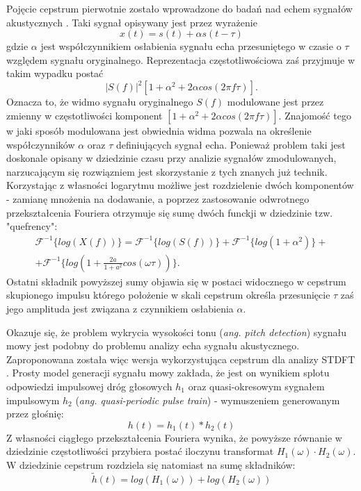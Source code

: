 Pojęcie cepstrum pierwotnie zostało wprowadzone do badań nad echem sygnałów akustycznych \cite{hdsp}. Taki sygnał opisywany jest przez wyrażenie 
\begin{equation}
     x(t) = s(t) + \alpha s(t - \tau) 
\end{equation} 
gdzie $ \alpha $ jest współczynnikiem osłabienia sygnału echa przesuniętego w czasie o $ \tau $ względem sygnału oryginalnego. Reprezentacja częstotliwościowa zaś przyjmuje w takim wypadku postać 
\begin{equation}
    |S(f)|^2\left[ 1+ \alpha^2+2\alpha cos(2\pi f\tau)\right].
\end{equation}
Oznacza to, że widmo sygnału oryginalnego $S(f)$ modulowane jest przez zmienny w częstotliwości komponent $[1 + \alpha^2 + 2\alpha cos(2\pi f \tau)]$. Znajomość tego w jaki sposób modulowana jest obwiednia widma pozwala na określenie współczynników $\alpha$  oraz $\tau$ definiujących sygnał echa. Ponieważ problem taki jest doskonale opisany w dziedzinie czasu przy analizie sygnałów zmodulowanych, narzucającym się rozwiązniem jest skorzystanie z tych znanych już technik. Korzystając z własności logarytmu możliwe jest rozdzielenie dwóch komponentów - zamianę mnożenia na dodawanie, a poprzez zastosowanie odwrotnego przekształcenia Fouriera otrzymuje się sumę dwóch funckji w dziedzinie tzw. "quefrency": 
\begin{equation}
    \begin{split}
    \mathcal{F}^{-1}\{log(X(f))\} =   \mathcal{F}^{-1}\{log(S(f))\} + \mathcal{F}^{-1}\{log(1+\alpha^2)\} + \\ + \mathcal{F}^{-1}\{log(1+\frac{2a}{1+a^2} cos(\omega \tau))\}.
    \end{split}
\end{equation}
Ostatni składnik powyższej sumy objawia się w postaci widocznego w cepstrum skupionego impulsu którego położenie w skali cepstrum określa przesunięcie $\tau$ zaś jego amplituda jest związana z czynnikiem osłabienia $\alpha$. 

Okazuje się, że problem wykrycia wysokości tonu (\textit{ang. pitch detection}) sygnału mowy jest podobny do problemu analizy echa sygnału akustycznego. Zaproponowana została więc wersja wykorzystująca cepstrum dla analizy STDFT \cite{noll}. Prosty model generacji sygnału mowy zakłada, że jest on wynikiem splotu odpowiedzi impulsowej dróg głosowych $h_1$ oraz quasi-okresowym sygnałem impulsowym $h_2$ (\textit{ang. quasi-periodic pulse train}) - wymuszeniem generowanym przez głośnię:
\begin{equation}
    h(t) = h_1(t)*h_2(t)
\end{equation}
Z własności ciągłego przekształcenia Fouriera wynika, że powyższe równanie w dziedzinie częstotliwości przybiera postać iloczynu transformat $H_1(\omega) \cdot H_2(\omega)$. W dziedzinie cepstrum rozdziela się natomiast na sumę składników:
\begin{equation}
    \tilde{h}(t) = log(H_1(\omega)) + log(H_2(\omega))
\end{equation}

